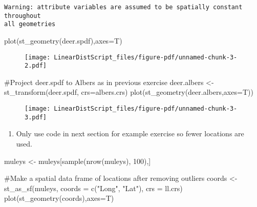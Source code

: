 \documentclass[
  letterpaper,
]{book}
\newenvironment{Shaded}{\begin{snugshade}}{\end{snugshade}}
\newcommand{\AttributeTok}[1]{\textcolor[rgb]{0.40,0.45,0.13}{#1}}
\newcommand{\CommentTok}[1]{\textcolor[rgb]{0.37,0.37,0.37}{#1}}
\newcommand{\DecValTok}[1]{\textcolor[rgb]{0.68,0.00,0.00}{#1}}
\newcommand{\FunctionTok}[1]{\textcolor[rgb]{0.28,0.35,0.67}{#1}}
\newcommand{\NormalTok}[1]{\textcolor[rgb]{0.00,0.23,0.31}{#1}}
\newcommand{\OtherTok}[1]{\textcolor[rgb]{0.00,0.23,0.31}{#1}}
\newcommand{\StringTok}[1]{\textcolor[rgb]{0.13,0.47,0.30}{#1}}
\providecommand{\tightlist}{%
  \setlength{\itemsep}{0pt}\setlength{\parskip}{0pt}}\usepackage{longtable,booktabs,array}
\begin{document}
\begin{verbatim}
Warning: attribute variables are assumed to be spatially constant throughout
all geometries
\end{verbatim}

\begin{Shaded}
\begin{Highlighting}[]
\FunctionTok{plot}\NormalTok{(}\FunctionTok{st\_geometry}\NormalTok{(deer.spdf),}\AttributeTok{axes=}\NormalTok{T)}
\end{Highlighting}
\end{Shaded}

\begin{figure}[H]

{\centering \texttt{[image: LinearDistScript\_files/figure-pdf/unnamed-chunk-3-2.pdf]}

}

\end{figure}

\begin{Shaded}
\begin{Highlighting}[]
\CommentTok{\#Project deer.spdf to Albers as in previous exercise}
\NormalTok{deer.albers }\OtherTok{\textless{}{-}}\FunctionTok{st\_transform}\NormalTok{(deer.spdf, }\AttributeTok{crs=}\NormalTok{albers.crs)}
\FunctionTok{plot}\NormalTok{(}\FunctionTok{st\_geometry}\NormalTok{(deer.albers,}\AttributeTok{axes=}\NormalTok{T))}
\end{Highlighting}
\end{Shaded}

\begin{figure}[H]

{\centering \texttt{[image: LinearDistScript\_files/figure-pdf/unnamed-chunk-3-3.pdf]}

}

\end{figure}

\begin{enumerate}
\def\labelenumi{\arabic{enumi}.}
\setcounter{enumi}{4}
\tightlist
\item
  Only use code in next section for example exercise so fewer locations
  are used.
\end{enumerate}

\begin{Shaded}
\begin{Highlighting}[]
\NormalTok{muleys }\OtherTok{\textless{}{-}}\NormalTok{ muleys[}\FunctionTok{sample}\NormalTok{(}\FunctionTok{nrow}\NormalTok{(muleys), }\DecValTok{100}\NormalTok{),]}

\CommentTok{\#Make a spatial data frame of locations after removing outliers}
\NormalTok{coords }\OtherTok{\textless{}{-}} \FunctionTok{st\_as\_sf}\NormalTok{(muleys, }\AttributeTok{coords =} \FunctionTok{c}\NormalTok{(}\StringTok{"Long"}\NormalTok{, }\StringTok{"Lat"}\NormalTok{), }\AttributeTok{crs =}\NormalTok{ ll.crs)}
\FunctionTok{plot}\NormalTok{(}\FunctionTok{st\_geometry}\NormalTok{(coords),}\AttributeTok{axes=}\NormalTok{T)}
\end{Highlighting}
\end{Shaded}
\end{document}

